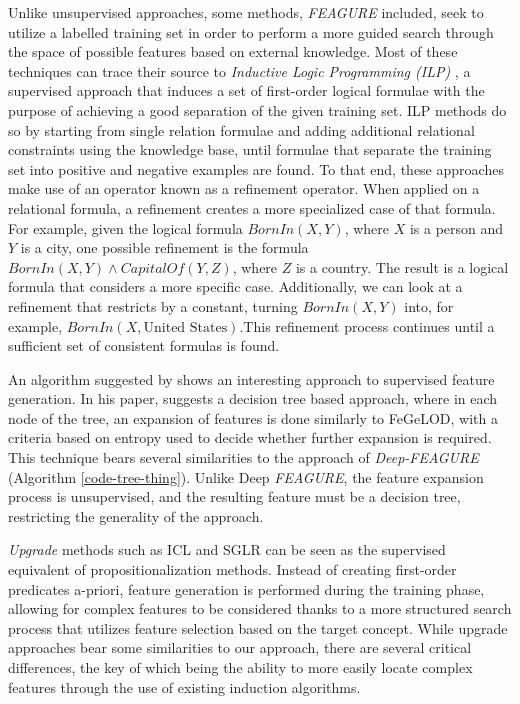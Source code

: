\documentclass[twoside,11pt]{article}
\theoremstyle{definition}
\begin{document}
Unlike unsupervised approaches, some methods, \emph{FEAGURE} included, seek to utilize a labelled training set in order to perform a more guided search through the space of possible features based on external knowledge. 
Most of these techniques can trace their source to \emph{Inductive Logic Programming (ILP)} \cite{quinlan1990learning,muggleton1991inductive}, a supervised approach that induces a set of first-order logical formulae with the purpose of achieving a good separation of the given training set. ILP methods do so by starting from single relation formulae and adding additional relational constraints using the knowledge base, until formulae that separate the training set into positive and negative examples are found. To that end, these approaches make use of an operator known as a refinement operator. When applied on a relational formula, a refinement creates a more specialized case of that formula. For example, given the logical formula $BornIn(X,Y)$, where $X$ is a person and $Y$ is a city, one possible refinement is the formula $BornIn(X,Y)\land CapitalOf(Y,Z)$, where $Z$ is a country. The result is a logical formula that considers a more specific case. Additionally, we can look at a refinement that restricts by a constant, turning $BornIn(X,Y)$ into, for example, $BornIn(X, \mbox{{United States}})$.This refinement process continues until a sufficient set of consistent formulas is found.

An algorithm suggested by  shows an interesting approach to supervised feature generation. In his paper,  suggests a decision tree based approach, where in each node of the tree, an expansion of features is done similarly to FeGeLOD, with a criteria based on entropy used to decide whether further expansion is required. This technique bears several similarities to the approach of \emph{Deep-FEAGURE} (Algorithm \ref{code-tree-thing}). Unlike Deep \emph{FEAGURE}, the feature expansion process is unsupervised, and the resulting feature must be a decision tree, restricting the generality of the approach.

 \emph{Upgrade} methods such as ICL \cite{van2001upgrade} and SGLR \cite{popescul200716} can be seen as the supervised equivalent of propositionalization methods. Instead of creating first-order predicates a-priori, feature generation is performed during the training phase, allowing for complex features to be considered thanks to a more structured search process that utilizes feature selection based on the target concept.
 While upgrade approaches bear some similarities to our approach, there are several critical differences, the key of which being the ability to more easily locate complex features through the use of existing induction algorithms. 
 
\end{document}

